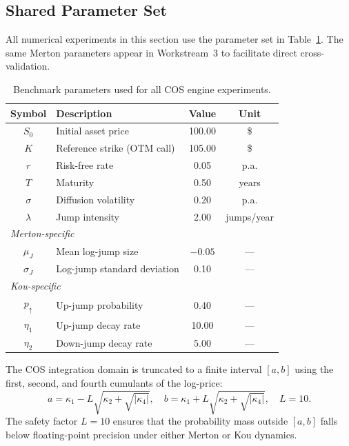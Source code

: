 \documentclass[12pt]{article}
\begin{document}
\subsection*{Shared Parameter Set}

All numerical experiments in this section use the parameter set in
Table~\ref{tab:cos_params}. The same Merton parameters appear in
Workstream~3 to facilitate direct cross-validation.

\begin{table}[ht]
  \centering
  \caption{Benchmark parameters used for all COS engine experiments.}
  \label{tab:cos_params}
  \begin{tabular}{clcc}
    \toprule
    \textbf{Symbol} & \textbf{Description} & \textbf{Value} & \textbf{Unit}\\
    \midrule
    $S_0$      & Initial asset price          & 100.00   & \$\\
    $K$        & Reference strike (OTM call)  & 105.00   & \$\\
    $r$        & Risk-free rate               & 0.05     & p.a.\\
    $T$        & Maturity                     & 0.50     & years\\
    $\sigma$   & Diffusion volatility         & 0.20     & p.a.\\
    $\lambda$  & Jump intensity               & 2.00     & jumps/year\\
    \midrule
    \multicolumn{4}{l}{\textit{Merton-specific}}\\
    $\mu_J$    & Mean log-jump size           & $-0.05$  & ---\\
    $\sigma_J$ & Log-jump standard deviation  & 0.10     & ---\\
    \midrule
    \multicolumn{4}{l}{\textit{Kou-specific}}\\
    $p_{\uparrow}$ & Up-jump probability      & 0.40     & ---\\
    $\eta_1$   & Up-jump decay rate           & 10.00    & ---\\
    $\eta_2$   & Down-jump decay rate         & 5.00     & ---\\
    \bottomrule
  \end{tabular}
\end{table}

The COS integration domain is truncated to a finite interval $[a,b]$
using the first, second, and fourth cumulants of the log-price:
\begin{equation}
  a = \kappa_1 - L\sqrt{\kappa_2+\sqrt{|\kappa_4|}},\quad
  b = \kappa_1 + L\sqrt{\kappa_2+\sqrt{|\kappa_4|}},\quad L=10.
  \label{eq:cos_truncation}
\end{equation}
The safety factor $L=10$ ensures that the probability mass outside
$[a,b]$ falls below floating-point precision under either Merton or
Kou dynamics.
\end{document}
